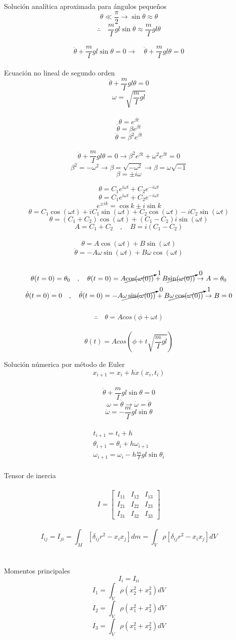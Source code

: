 \documentclass[10pt,a4papper]{article}
\begin{document}
\newpage
Solución analítica aproximada para ángulos pequeños
\[\theta\ll\frac{\pi}{2}\to\sin\theta\approx\theta\]
\[\therefore\quad\frac{m}{I}gl\sin\theta\approx\frac{m}{I}gl\theta\]\\
\[\ddot\theta+\frac{m}{I}gl\sin\theta=0\to\quad\ddot\theta+\frac{m}{I}gl\theta=0\]\\
Ecuación no lineal de segundo orden
\[\ddot\theta+\frac{m}{I}gl\theta=0\]
\[\omega=\sqrt{\frac{m}{I}gl}\]\\
\[\theta=e^{\beta t}\]
\[\dot\theta=\beta e^{\beta t}\]
\[\ddot\theta=\beta^2e^{\beta t}\]\\
\[\ddot\theta+\frac{m}{I}gl\theta=0\to\beta^2e^{\beta t}+\omega^2e^{\beta t}=0\]
\[\beta^2=-\omega^2\to\beta=\sqrt{-\omega^2}\to\beta=\omega\sqrt{-1}\]
\[\beta=\pm i\omega\]

\newpage
\[\theta=C_1e^{i\omega t}+C_2e^{-i\omega t}\]
\[\theta=C_1e^{i\omega t}+C_2e^{-i\omega t}\]
\[e^{\pm ik}=\cos k\pm i\sin k\]
\[\theta=C_1\cos(\omega t)+iC_1\sin(\omega t)+C_2\cos(\omega t)-iC_2\sin(\omega t)\]
\[\theta=(C_1+C_2)\cos(\omega t)+(C_1-C_2)i\sin(\omega t)\]
\[A=C_1+C_2\quad,\quad B=i(C_1-C_2)\]\\
\[\theta=A\cos(\omega t)+B\sin(\omega t)\]
\[\dot\theta=-A\omega\sin(\omega t)+B\omega\cos(\omega t)\]\\
\[\theta(t=0)=\theta_0\quad,\quad\theta(t=0)=A\cancelto{1}{\cos(\omega(0))}+B\cancelto{0}{\sin(\omega(0))}\to A=\theta_0\]
\[\dot\theta(t=0)=0\quad,\quad\dot\theta(t=0)=-A\cancelto{0}{\omega\sin(\omega(0))}+B\cancelto{1}{\omega\cos(\omega(0))}\to B=0\]\\
\[\therefore\quad\theta=Acos(\phi+\omega t)\]\\
\[\boxed{\theta(t)=Acos\left(\phi+t\sqrt{\frac{m}{I}gl}\right)}\]

\newpage
Solución númerica por método de Euler
\[x_{i+1}=x_i+h\dot x(x_i,t_i)\]\\
\[\ddot\theta+\frac{m}{I}gl\sin\theta=0\]
\[\omega=\dot\theta\to\dot\omega=\ddot\theta\]
\[\dot\omega=-\frac{m}{I}gl\sin\theta\]\\
\[\boxed{
  \begin{array}{rcl}
    t_{i+1}=t_i+h\\
    \theta_{i+1}=\theta_i+h\omega_{i+1}\\
    \omega_{i+1}=\omega_i-h\frac{m}{I}gl\sin\theta_i
  \end{array}
}\]\\

\newpage
\LARGE
Tensor de inercia\\\\
\Large
\[I=\begin{bmatrix}
I_{11} & I_{12} & I_{13}\\
I_{21} & I_{22} & I_{23}\\
I_{31} & I_{32} & I_{33}
\end{bmatrix}\]\\
\[I_{ij}=I_{ji}=\int_M\left[\delta_{ij}r^2-x_ix_j\right]dm=\int_V\rho\left[\delta_{ij}r^2-x_ix_j\right]dV\]\\\\
Momentos principales\\
\[I_i=I_{ii}\]
\[I_1=\int_V\rho(x_2^2+x_3^2)dV\]
\[I_2=\int_V\rho(x_1^2+x_3^2)dV\]
\[I_3=\int_V\rho(x_1^2+x_2^2)dV\]
\end{document}
